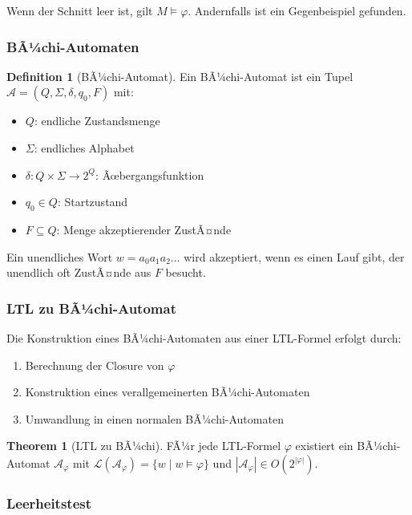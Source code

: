 ﻿\documentclass[a4paper,12pt]{article}
\theoremstyle{definition}
\newtheorem{definition}{Definition}[section]
\newtheorem{theorem}{Theorem}[section]
\begin{document}
Wenn der Schnitt leer ist, gilt $M \models \varphi$. Andernfalls ist ein Gegenbeispiel gefunden.

\subsubsection{BÃ¼chi-Automaten}

\begin{definition}[BÃ¼chi-Automat]
	Ein BÃ¼chi-Automat ist ein Tupel $\mathcal{A} = (Q, \Sigma, \delta, q_0, F)$ mit:
	\begin{itemize}
		\item[-] $Q$: endliche Zustandsmenge
		\item[-] $\Sigma$: endliches Alphabet
		\item[-] $\delta: Q \times \Sigma \to 2^Q$: Ãœbergangsfunktion
		\item[-] $q_0 \in Q$: Startzustand
		\item[-] $F \subseteq Q$: Menge akzeptierender ZustÃ¤nde
	\end{itemize}
	Ein unendliches Wort $w = a_0 a_1 a_2 \ldots$ wird akzeptiert, wenn es einen Lauf gibt, der unendlich oft ZustÃ¤nde aus $F$ besucht.
\end{definition}

\subsubsection{LTL zu BÃ¼chi-Automat}

Die Konstruktion eines BÃ¼chi-Automaten aus einer LTL-Formel erfolgt durch:
\begin{enumerate}
	\item Berechnung der Closure von $\varphi$
	\item Konstruktion eines verallgemeinerten BÃ¼chi-Automaten
	\item Umwandlung in einen normalen BÃ¼chi-Automaten
\end{enumerate}

\begin{theorem}[LTL zu BÃ¼chi]
	FÃ¼r jede LTL-Formel $\varphi$ existiert ein BÃ¼chi-Automat $\mathcal{A}_\varphi$ mit $\mathcal{L}(\mathcal{A}_\varphi) = \{w \mid w \models \varphi\}$ und $|\mathcal{A}_\varphi| \in O(2^{|\varphi|})$.
\end{theorem}

\subsubsection{Leerheitstest}
\end{document}

